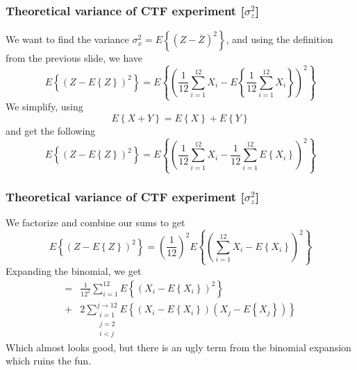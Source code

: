 \documentclass[compress]{beamer}
\newcommand{\E}[1]{\ensuremath{E\left\{#1\right\}}}
\begin{document}
\begin{frame}
    \frametitle{Theoretical variance of CTF experiment [$\sigma_z^2$]}
    We want to find the variance $\sigma_x^2 = \E{(Z-\bar{Z})^2}$, and using 
    the definition from the previous slide, we have
    \begin{equation*}
        \E{(Z-\E{Z})^2}=\E{\left(\frac{1}{12}\sum^{12}_{i=1}{X_i} -
        \E{\frac{1}{12}\sum^{12}_{i=1}{X_i}}\right)^2}
    \end{equation*}
    \pause
    We simplify, using
    \begin{equation}
        \E{X+Y} = \E{X} + \E{Y}
    \end{equation}
    and get the following
    \begin{equation*}
        \E{(Z-\E{Z})^2}=\E{\left(\frac{1}{12}\sum^{12}_{i=1}{X_i} 
                - \frac{1}{12}
        \sum^{12}_{i=1}{\E{X_i}}\right)^2}
    \end{equation*}
\end{frame}
\begin{frame}
    \frametitle{Theoretical variance of CTF experiment [$\sigma_z^2$]}
    We factorize and combine our sums to get
    \begin{equation*}
        \E{(Z-\E{Z})^2} = \left(\frac{1}{12}\right)^2
        \E{\left(\sum^{12}_{i=1}{X_i - \E{X_i}}\right)^2}
    \end{equation*}
    \pause
    Expanding the binomial, we get
    \begin{align*}
        = & \frac{1}{12^2}\sum^{12}_{i=1}{\E{\left(X_i - \E{X_i}\right)^2}} \\
        + & 2 \sum^{j\rightarrow12}_{\substack{i=1\\j=2\\i<j}}
        {\E{(X_i - \E{X_i})(X_j - \E{X_j})}}
    \end{align*}
    Which almost looks good, but there is an ugly term from the binomial
    expansion which ruins the fun.
\end{frame}
\end{document}
